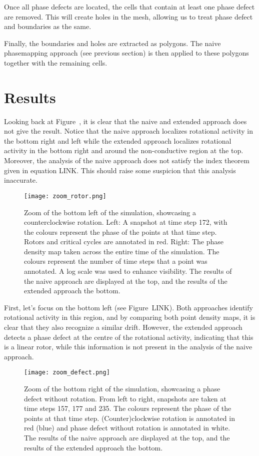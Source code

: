 \documentclass[twocolumn]{article}
\begin{document}
Once all phase defects are located, the cells that contain at least one
phase defect are removed. This will create holes in the mesh, allowing
us to treat phase defect and boundaries as the same.

Finally, the boundaries and holes are extracted as polygons. The naive
phasemapping approach (see previous section) is then applied to these
polygons together with the remaining cells.

\section{Results}\label{results}

Looking back at Figure~, it is clear that the naive
and extended approach does not give the result. Notice that the naive
approach localizes rotational activity in the bottom right and left
while the extended approach localizes rotational activity in the bottom
right and around the non-conductive region at the top. Moreover, the
analysis of the naive approach does not satisfy the index theorem given
in equation LINK. This should raise some suspicion that this analysis
inaccurate.

\begin{figure}
\centering
\texttt{[image: zoom\_rotor.png]}
\caption{Zoom of the bottom left of the simulation, showcasing a
counterclockwise rotation. Left: A snapshot at time step 172, with the
colours represent the phase of the points at that time step. Rotors and
critical cycles are annotated in red. Right: The phase density map taken
across the entire time of the simulation. The colours represent the
number of time steps that a point was annotated. A log scale was used to
enhance visibility. The results of the naive approach are displayed at
the top, and the results of the extended approach the bottom.}
\end{figure}

First, let's focus on the bottom left (see Figure~LINK).
Both approaches identify rotational activity in this region, and by
comparing both point density maps, it is clear that they also recognize
a similar drift. However, the extended approach detects a phase defect
at the centre of the rotational activity, indicating that this is a
linear rotor, while this information is not present in the analysis of
the naive approach.

\begin{figure}
\centering
\texttt{[image: zoom\_defect.png]}
\caption{Zoom of the bottom right of the simulation, showcasing a phase
defect without rotation. From left to right, snapshots are taken at time
steps 157, 177 and 235. The colours represent the phase of the points at
that time step. (Counter)clockwise rotation is annotated in red (blue)
and phase defect without rotation is annotated in white. The results of
the naive approach are displayed at the top, and the results of the
extended approach the bottom.}
\end{figure}
\end{document}

